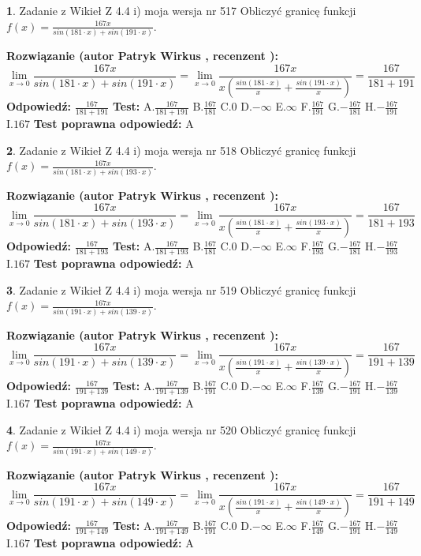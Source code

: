 \documentclass[12pt, a4paper]{article}
\theoremstyle{definition} %
\newtheorem{zad}{}
\newcommand{\zadStart}[1]{\begin{zad}#1\newline}
\newcommand{\zadStop}{\end{zad}}
\newcommand{\rozwStart}[2]{\noindent \textbf{Rozwiązanie (autor #1 , recenzent #2): }\newline}
\newcommand{\rozwStop}{\newline}
\newcommand{\odpStart}{\noindent \textbf{Odpowiedź:}\newline}
\newcommand{\odpStop}{\newline}
\newcommand{\testStart}{\noindent \textbf{Test:}\newline}
\newcommand{\testStop}{\newline}
\newcommand{\kluczStart}{\noindent \textbf{Test poprawna odpowiedź:}\newline}
\newcommand{\kluczStop}{\newline}
\begin{document}
\zadStart{Zadanie z Wikieł Z 4.4 i) moja wersja nr 517}
Obliczyć granicę funkcji $f(x)=\frac{167x}{sin(181\cdot x) +sin(191\cdot x)}$.
\zadStop
\rozwStart{Patryk Wirkus}{}
$$\lim\limits_{x\to 0}\frac{167x}{sin(181\cdot x) +sin(191\cdot x)}=\lim\limits_{x\to 0}\frac{167x}{x(\frac{sin(181\cdot x)}{x}+\frac{sin(191\cdot x)}{x})}=\frac{167}{181+191}$$
\rozwStop
\odpStart
$\frac{167}{181+191}$
\odpStop
\testStart
A.$\frac{167}{181+191}$
B.$\frac{167}{181}$
C.$0$
D.$-\infty$
E.$\infty$
F.$\frac{167}{191}$
G.$-\frac{167}{181}$
H.$-\frac{167}{191}$
I.$167$
\testStop
\kluczStart
A
\kluczStop



\zadStart{Zadanie z Wikieł Z 4.4 i) moja wersja nr 518}
Obliczyć granicę funkcji $f(x)=\frac{167x}{sin(181\cdot x) +sin(193\cdot x)}$.
\zadStop
\rozwStart{Patryk Wirkus}{}
$$\lim\limits_{x\to 0}\frac{167x}{sin(181\cdot x) +sin(193\cdot x)}=\lim\limits_{x\to 0}\frac{167x}{x(\frac{sin(181\cdot x)}{x}+\frac{sin(193\cdot x)}{x})}=\frac{167}{181+193}$$
\rozwStop
\odpStart
$\frac{167}{181+193}$
\odpStop
\testStart
A.$\frac{167}{181+193}$
B.$\frac{167}{181}$
C.$0$
D.$-\infty$
E.$\infty$
F.$\frac{167}{193}$
G.$-\frac{167}{181}$
H.$-\frac{167}{193}$
I.$167$
\testStop
\kluczStart
A
\kluczStop



\zadStart{Zadanie z Wikieł Z 4.4 i) moja wersja nr 519}
Obliczyć granicę funkcji $f(x)=\frac{167x}{sin(191\cdot x) +sin(139\cdot x)}$.
\zadStop
\rozwStart{Patryk Wirkus}{}
$$\lim\limits_{x\to 0}\frac{167x}{sin(191\cdot x) +sin(139\cdot x)}=\lim\limits_{x\to 0}\frac{167x}{x(\frac{sin(191\cdot x)}{x}+\frac{sin(139\cdot x)}{x})}=\frac{167}{191+139}$$
\rozwStop
\odpStart
$\frac{167}{191+139}$
\odpStop
\testStart
A.$\frac{167}{191+139}$
B.$\frac{167}{191}$
C.$0$
D.$-\infty$
E.$\infty$
F.$\frac{167}{139}$
G.$-\frac{167}{191}$
H.$-\frac{167}{139}$
I.$167$
\testStop
\kluczStart
A
\kluczStop



\zadStart{Zadanie z Wikieł Z 4.4 i) moja wersja nr 520}
Obliczyć granicę funkcji $f(x)=\frac{167x}{sin(191\cdot x) +sin(149\cdot x)}$.
\zadStop
\rozwStart{Patryk Wirkus}{}
$$\lim\limits_{x\to 0}\frac{167x}{sin(191\cdot x) +sin(149\cdot x)}=\lim\limits_{x\to 0}\frac{167x}{x(\frac{sin(191\cdot x)}{x}+\frac{sin(149\cdot x)}{x})}=\frac{167}{191+149}$$
\rozwStop
\odpStart
$\frac{167}{191+149}$
\odpStop
\testStart
A.$\frac{167}{191+149}$
B.$\frac{167}{191}$
C.$0$
D.$-\infty$
E.$\infty$
F.$\frac{167}{149}$
G.$-\frac{167}{191}$
H.$-\frac{167}{149}$
I.$167$
\testStop
\kluczStart
A
\kluczStop
\end{document}
